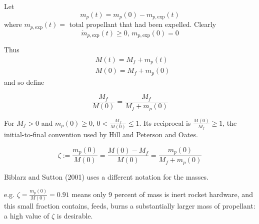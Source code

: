 Let
\begin{equation}\label{Eq:PropellantRemainingBookkeeping}
m_p(t)  = m_p(0) - m_{p,\text{exp}}(t)
\end{equation}
where $m_{p,\text{exp}}(t) = $ total propellant that had been expelled.
Clearly
\begin{equation}
\dot{m}_{p, \text{exp}}(t) \geq 0, \, m_{p,\text{exp}}(0) = 0
\end{equation}

Thus
\begin{equation}\label{Eq:MassBookkeeping}
\begin{aligned}
& M(t) = M_f + m_p(t)  \\
& M(0) = M_f + m_p(0)
\end{aligned}
\end{equation}
and so define
\begin{definition}
\begin{equation}\label{Eq:MassRatioDefinition}
\frac{M_f}{M(0)}	= \frac{M_f}{ M_f + m_p(0)}
\end{equation}
	\end{definition}
For $M_f>0$ and $m_p(0)\ge0$, $0<\frac{M_f}{M(0)}\le1$. Its reciprocal is
$\frac{M(0)}{M_f}\ge1$, the initial-to-final convention used by
Hill and Peterson and Oates.

\begin{definition}
	\begin{equation}\label{Eq:PropellantMassFractionDefinition}
	\zeta := \frac{m_p(0)}{ M(0)} = \frac{M(0) - M_f}{M(0)}
	 = \frac{m_p(0)}{M_f + m_p(0)}
	\end{equation}
	\end{definition}
Biblarz and Sutton (2001) uses a different notation for the masses.

e.g. $\zeta = \frac{m_p(0)}{ M(0)} = 0.91$ means only 9 percent of mass is
inert rocket hardware, and this small fraction contains, feeds, burns a
substantially larger mass of propellant: a high value of $\zeta$ is
desirable.

